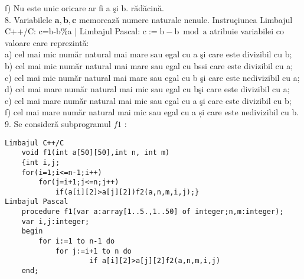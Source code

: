 f) Nu este unic oricare ar fi a şi b. rădăcină.\\
8. Variabilele $\mathbf{a}, \mathbf{b}, \mathbf{c}$ memorează numere naturale nenule. Instruçiunea Limbajul C++/C: c=b-b\%a | Limbajul Pascal: $\mathrm{c}:=\mathrm{b}-\mathrm{b} \bmod \mathrm{a}$ atribuie variabilei co valoare care reprezintă:\\
a) cel mai mic număr natural mai mare sau egal cu a şi care este divizibil cu b;\\
b) cel mai mic număr natural mai mare sau egal cu bssi care este divizibil cu a;\\
c) cel mai mic număr natural mai mare sau egal cu b şi care este nedivizibil cu a;\\
d) cel mai mare număr natural mai mic sau egal cu bşi care este divizibil cu a;\\
e) cel mai mare număr natural mai mic sau egal cu a şi care este divizibil cu b;\\
f) cel mai mare număr natural mai mic sau egal cu a și care este nedivizibil cu b.\\
9. Se consideră subprogramul $f 1$ :

\begin{verbatim}
Limbajul C++/C
    void f1(int a[50][50],int n, int m)
    {int i,j;
    for(i=1;i<=n-1;i++)
        for(j=i+1;j<=n;j++)
            if(a[i][2]>a[j][2])f2(a,n,m,i,j);}
Limbajul Pascal
    procedure f1(var a:array[1..5.,1..50] of integer;n,m:integer);
    var i,j:integer;
    begin
        for i:=1 to n-1 do
            for j:=i+1 to n do
                    if a[i][2]>a[j][2]f2(a,n,m,i,j)
    end;
\end{verbatim}

